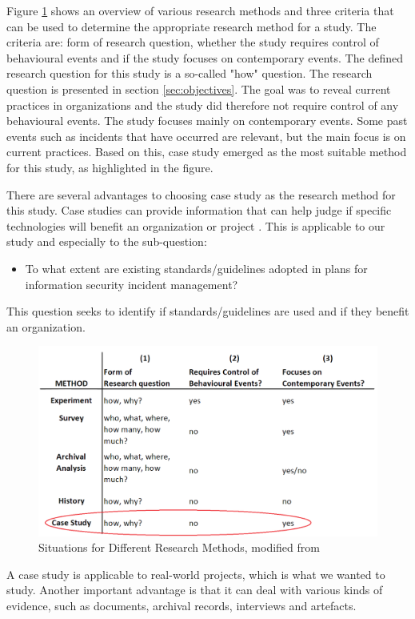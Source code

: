 \label{sec:choiceOfMethod}
Figure \ref{fig:methods} shows an overview of various research methods and three criteria that can be used to determine the appropriate research method for a study. The criteria are: form of research question, whether the study requires control of behavioural events and if the study focuses on contemporary events. The defined research question for this study is a so-called "how" question. The research question is presented in section \ref{sec:objectives}. The goal was to reveal current practices in organizations and the study did therefore not require control of any behavioural events. The study focuses mainly on contemporary events. Some past events such as incidents that have occurred are relevant, but the main focus is on current practices. Based on this, case study emerged as the most suitable method for this study, as highlighted in the figure.

There are several advantages to choosing case study as the research method for this study. Case studies can provide information that can help judge if specific technologies will benefit an organization or project \cite{kitchenham1995case}. This is applicable to our study and especially to the sub-question:

\begin{itemize}
\item To what extent are existing standards/guidelines adopted in plans for information security incident management?
\end{itemize}

This question seeks to identify if standards/guidelines are used and if they benefit an organization.

\begin{figure}[H]
\begin{center}
\includegraphics[scale=0.35]{methods.png}
\caption[Situations for Different Research Methods]{Situations for Different Research Methods, modified from \cite{CaseStudyResearch}}
\label{fig:methods}
\end{center}
\end{figure}

A case study is applicable to real-world projects, which is what we wanted to study. Another important advantage is that it can deal with various kinds of evidence, such as documents, archival records, interviews and artefacts.